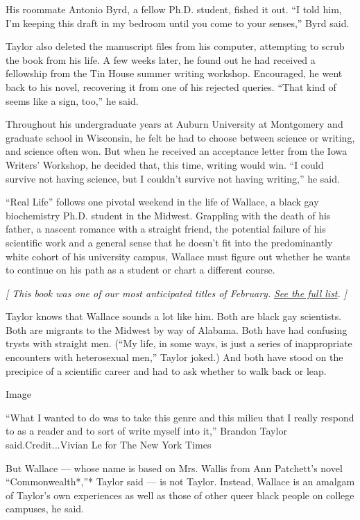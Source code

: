 His roommate Antonio Byrd, a fellow Ph.D. student, fished it out. ``I
told him, I'm keeping this draft in my bedroom until you come to your
senses,'' Byrd said.

Taylor also deleted the manuscript files from his computer, attempting
to scrub the book from his life. A few weeks later, he found out he had
received a fellowship from the Tin House summer writing workshop.
Encouraged, he went back to his novel, recovering it from one of his
rejected queries. ``That kind of seems like a sign, too,'' he said.

Throughout his undergraduate years at Auburn University at Montgomery
and graduate school in Wisconsin, he felt he had to choose between
science or writing, and science often won. But when he received an
acceptance letter from the Iowa Writers' Workshop, he decided that, this
time, writing would win. ``I could survive not having science, but I
couldn't survive not having writing,'' he said.

``Real Life'' follows one pivotal weekend in the life of Wallace, a
black gay biochemistry Ph.D. student in the Midwest. Grappling with the
death of his father, a nascent romance with a straight friend, the
potential failure of his scientific work and a general sense that he
doesn't fit into the predominantly white cohort of his university
campus, Wallace must figure out whether he wants to continue on his path
as a student or chart a different course.

\emph{{[} This book was one of our most anticipated titles of February.}
\href{https://www.nytimes3xbfgragh.onion/2020/01/29/books/new-february-books.html?smid=nytcore-ios-share}{\emph{See
the full list}}\emph{. {]}}

Taylor knows that Wallace sounds a lot like him. Both are black gay
scientists. Both are migrants to the Midwest by way of Alabama. Both
have had confusing trysts with straight men. (``My life, in some ways,
is just a series of inappropriate encounters with heterosexual men,''
Taylor joked.) And both have stood on the precipice of a scientific
career and had to ask whether to walk back or leap.

Image

``What I wanted to do was to take this genre and this milieu that I
really respond to as a reader and to sort of write myself into it,''
Brandon Taylor said.Credit...Vivian Le for The New York Times

But Wallace --- whose name is based on Mrs. Wallis from Ann Patchett's
novel ``Commonwealth*,''* Taylor said --- is not Taylor. Instead,
Wallace is an amalgam of Taylor's own experiences as well as those of
other queer black people on college campuses, he said.

